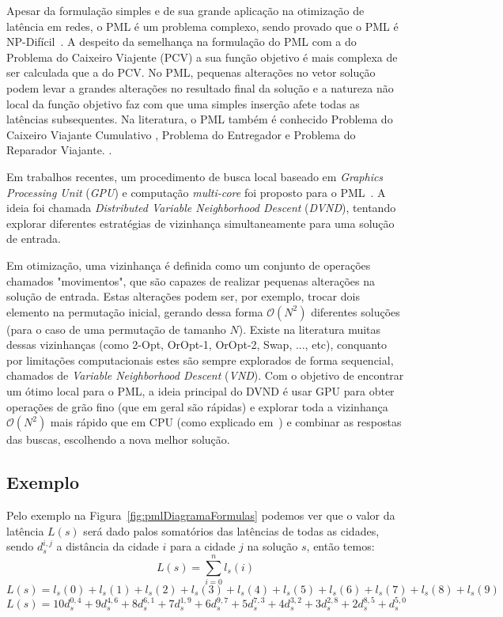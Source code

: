 Apesar da formulação simples e de sua grande aplicação na otimização de latência em redes, o PML é um problema complexo, sendo provado que o PML é NP-Difícil~\cite{silva2012}. A despeito da semelhança na formulação do PML com a do Problema do Caixeiro Viajente (PCV) a sua função objetivo é mais complexa de ser calculada que a do PCV.
No PML, pequenas alterações no vetor solução podem levar a grandes alterações no resultado final da solução e a natureza não local da função objetivo faz com que uma simples inserção afete todas as latências subsequentes.
Na literatura, o PML também é conhecido Problema do Caixeiro Viajante Cumulativo \cite{bianco1993}, Problema do Entregador \cite{mladenovic2013} e Problema do Reparador Viajante. \cite{tsitsiklis1992}.

Em trabalhos recentes, um procedimento de busca local baseado em \emph{Graphics Processing Unit} (\emph{GPU}) e computação \emph{multi-core} foi proposto para o PML~\cite{wamca2016}.
A ideia foi chamada \emph{Distributed Variable Neighborhood Descent} (\emph{DVND}), tentando explorar diferentes estratégias de vizinhança simultaneamente para uma solução de entrada.

Em otimização, uma vizinhança é definida como um conjunto de operações chamados "movimentos", que são capazes de realizar pequenas alterações na solução de entrada.
Estas alterações podem ser, por exemplo, trocar dois elemento na permutação inicial, gerando dessa forma $\mathcal{O}(N^2)$ diferentes soluções (para o caso de uma permutação de tamanho $N$). Existe na literatura muitas dessas vizinhanças (como 2-Opt, OrOpt-1, OrOpt-2, Swap, ..., etc), conquanto por limitações computacionais estes são sempre explorados de forma sequencial, chamados de \emph{Variable Neighborhood Descent} (\emph{VND}).
Com o objetivo de encontrar um ótimo local para o PML, a ideia principal do DVND é usar GPU para obter operações de grão fino (que em geral são rápidas) e explorar toda a vizinhança $\mathcal{O}(N^2)$ mais rápido que em CPU (como explicado em~\cite{wamca2016}) e combinar as respostas das buscas, escolhendo a nova melhor solução.

\subsection{Exemplo}


Pelo exemplo na Figura~\ref{fig:pmlDiagramaFormulas} podemos ver que o valor da latência $L(s)$ será dado palos somatórios das latências de todas as cidades, sendo $d_s^{i, j}$ a distância da cidade $i$ para a cidade $j$ na solução $s$, então temos:
$$ L(s) = \sum_{i=0}^n{l_s(i)} $$
$$ L(s) = l_s(0) + l_s(1) + l_s(2) + l_s(3) + l_s(4) + l_s(5) + l_s(6) + l_s(7) + l_s(8) + l_s(9) $$
$$ L(s) = 10d_s^{0, 4} + 9d_s^{4, 6} + 8d_s^{6, 1} + 7d_s^{1, 9} + 6d_s^{9, 7} + 5d_s^{7, 3} + 4d_s^{3, 2} + 3d_s^{2, 8} + 2d_s^{8, 5} + d_s^{5, 0}$$
